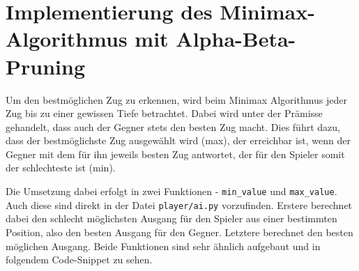     \section{Implementierung des Minimax-Algorithmus mit
Alpha-Beta-Pruning}\label{implementierung-des-minimax-algorithmus-mit-alpha-beta-pruning}

Um den bestmöglichen Zug zu erkennen, wird beim Minimax Algorithmus
jeder Zug bis zu einer gewissen Tiefe betrachtet. Dabei wird unter der
Prämisse gehandelt, dass auch der Gegner stets den besten Zug macht.
Dies führt dazu, dass der bestmöglichste Zug ausgewählt wird (max), der
erreichbar ist, wenn der Gegner mit dem für ihn jeweils besten Zug
antwortet, der für den Spieler somit der schlechteste ist (min).

Die Umsetzung dabei erfolgt in zwei Funktionen - \texttt{min\_value} und
\texttt{max\_value}. Auch diese sind direkt in der Datei
\texttt{player/ai.py} vorzufinden. Erstere berechnet dabei den schlecht
möglichsten Ausgang für den Spieler aus einer bestimmten Position, also
den besten Ausgang für den Gegner. Letztere berechnet den besten
möglichen Ausgang. Beide Funktionen sind sehr ähnlich aufgebaut und in
folgendem Code-Snippet zu sehen.

